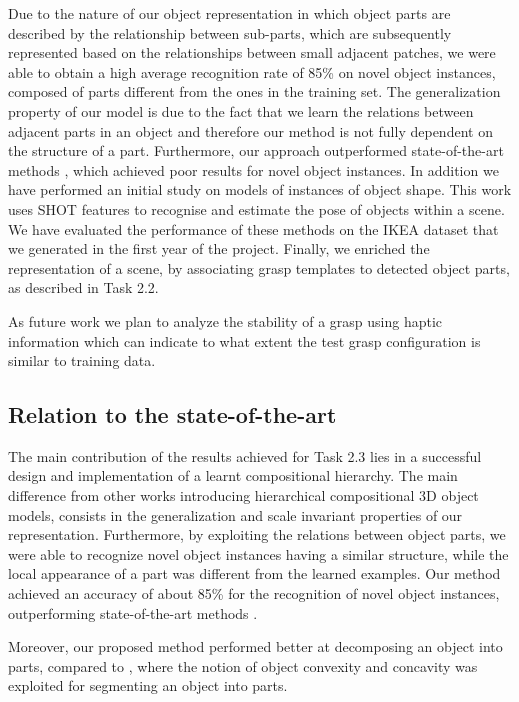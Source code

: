 \documentclass[a4paper,11pt,pdf]{pacmanreport}
\begin{document}
Due to the nature of our object representation in which object parts are described by the relationship between sub-parts, which are subsequently represented based on the relationships between small adjacent patches, we were able to obtain a high average recognition rate of 85\% on novel object instances, composed of parts different from the ones in the training set. The generalization property of our model is due to the fact that we learn the relations between adjacent parts in an object and therefore our method is not fully dependent on the structure of a part. Furthermore, our approach outperformed state-of-the-art methods \cite{vfh}, which achieved poor results  for novel object instances. In addition we have performed an initial study on models of instances of object shape. This work uses SHOT features to recognise and estimate the pose of objects within a scene. We have evaluated the performance of these methods on the IKEA dataset that we generated in the first year of the project. Finally, we enriched the representation of a scene, by associating grasp templates to detected object parts, as described in Task 2.2.

As future work we plan to analyze the stability of a grasp using haptic information which can indicate to what extent the test grasp configuration is similar to training data.

\subsection{Relation to the state-of-the-art}

The main contribution of the results achieved for Task 2.3 lies in a successful design and implementation of a learnt compositional hierarchy. The main 
difference from other works \cite{rel2,comp2} introducing hierarchical 
compositional 3D object models, consists in the generalization and scale 
invariant properties of our representation. 
Furthermore, by exploiting the relations between object parts, we were able to 
recognize novel object instances having a similar structure, while the local 
appearance of a part was different from the learned examples. Our method 
achieved an accuracy of about 85\% for the recognition of novel object instances, 
outperforming state-of-the-art methods \cite{vfh}. 

Moreover, our proposed method performed better at decomposing an object into 
parts, compared to \cite{rel7}, where the notion of object convexity and 
concavity was exploited for segmenting an object into parts.
\end{document}
